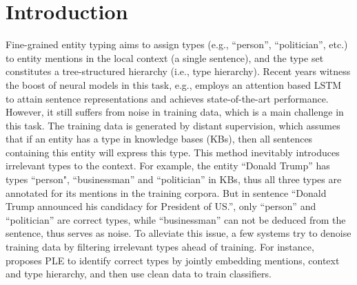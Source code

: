 \documentclass[letterpaper]{article} %
\begin{document}
\section{Introduction}
\noindent Fine-grained entity typing aims to assign types (e.g., ``person'', ``politician'', etc.) %
to entity mentions in the local context (a single sentence), and the type set constitutes a tree-structured hierarchy (i.e., type hierarchy). %
Recent years witness the boost of neural models in this task, e.g., \cite{Shimaoka2016Neural} employs an attention based LSTM to attain sentence representations and achieves state-of-the-art performance. However, it still suffers from noise in training data,  which is a main challenge in this task. %
The training data is generated by distant supervision, which assumes that if an entity has a type in knowledge bases (KBs), then all sentences containing this entity will express this type. %
This method inevitably introduces irrelevant types to the context. 
For example, the entity ``Donald Trump'' has types ``person", ``businessman'' and ``politician'' in KBs, thus all three types are annotated for its mentions in the training corpora. But in sentence ``Donald Trump announced his candidacy for President of US.'', only ``person'' and ``politician'' are correct types, %
while ``businessman'' can not be deduced from the sentence, thus serves as noise. 
To alleviate this issue, a few systems try to denoise training data by filtering irrelevant types ahead of training. %
For instance, \cite{Ren2016Label} proposes PLE to  identify correct types by jointly embedding mentions, context and type hierarchy, and then use clean data to train classifiers. %
\end{document}

